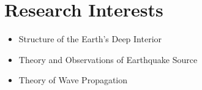 \section*{Research Interests}

\begin{itemize}
\item Structure of the Earth's Deep Interior
\item Theory and Observations of Earthquake Source
\item Theory of Wave Propagation
\end{itemize}
